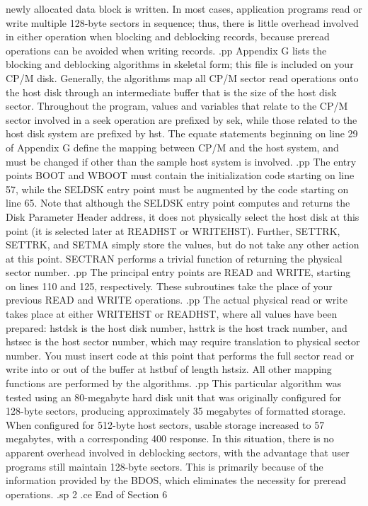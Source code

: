 newly allocated data block is written.  In most cases, 
application programs read or write multiple 128-byte sectors in 
sequence; thus, there is little overhead involved in either 
operation when blocking and deblocking records, because preread 
operations can be avoided when writing records.
.pp
Appendix G lists the blocking and deblocking algorithms in 
skeletal form; this file is included on your CP/M disk.  
Generally, the algorithms map all CP/M sector read operations 
onto the host disk through an intermediate buffer that is the 
size of the host disk sector.  Throughout the program, values and 
variables that relate to the CP/M sector involved in a seek 
operation are prefixed by sek, while those related to the host 
disk system are prefixed by hst.  The equate statements beginning 
on line 29 of Appendix G define the mapping between CP/M and the 
host system, and must be changed if other than the sample host 
system is involved.
.pp
The entry points BOOT and WBOOT must contain the initialization 
code starting on line 57, while the SELDSK entry point must be 
augmented by the code starting on line 65.  Note that although 
the SELDSK entry point computes and returns the Disk Parameter 
Header address, it does not physically select the host disk at 
this point (it is selected later at READHST or WRITEHST).  
Further, SETTRK, SETTRK, and SETMA simply store the values, but 
do not take any other action at this point.  SECTRAN performs a 
trivial function of returning the physical sector number.
.pp
The principal entry points are READ and WRITE, starting on lines 
110 and 125, respectively.  These subroutines take the place of 
your previous READ and WRITE operations.
.pp
The actual physical read or write takes place at either WRITEHST 
or READHST, where all values have been prepared:  hstdsk is the 
host disk number, hsttrk is the host track number, and
hstsec is the host sector number, which 
may require translation to physical sector number.  You must 
insert code at this point that performs the full sector read or write
into or out of the buffer at hstbuf of length hstsiz.  All other mapping 
functions are performed by the algorithms.
.pp
This particular algorithm was tested using an 80-megabyte hard 
disk unit that was originally configured for 128-byte sectors, 
producing approximately 35 megabytes of formatted storage.  When 
configured for 512-byte host sectors, usable storage increased to 
57 megabytes, with a corresponding 400%
response.  In this situation, there is no apparent overhead 
involved in deblocking sectors, with the advantage that user 
programs still maintain 128-byte sectors.  This is primarily 
because of the information provided by the BDOS, which eliminates 
the necessity for preread operations.
.sp 2
.ce
End of Section 6













